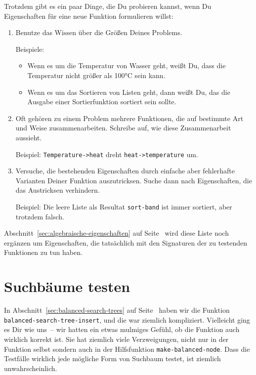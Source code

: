Trotzdem gibt es ein paar Dinge, die Du probieren kannst, wenn Du
Eigenschaften für eine neue Funktion formulieren willst:
%
\begin{enumerate}
\item Benutze das Wissen über die Größen Deines Problems.

  Beispiele:

  \begin{itemize}
    \item Wenn es um die Temperatur von Wasser geht, weißt Du,
    dass die Temperatur nicht größer als 100\si{\degree}C sein kann.
  \item Wenn es um das Sortieren von Listen geht, dann weißt Du, das
    die Ausgabe einer Sortierfunktion sortiert sein sollte.
  \end{itemize}
\item Oft gehören zu einem Problem mehrere Funktionen, die auf
  bestimmte Art und Weise zusammenarbeiten.  Schreibe auf, wie diese
  Zusammenarbeit aussieht.

  Beispiel: \lstinline{Temperature->heat} dreht
  \lstinline{heat->temperature} um.
\item Versuche, die bestehenden Eigenschaften durch einfache aber
  fehlerhafte Varianten Deiner Funktion auszutricksen.
  Suche dann nach
  Eigenschaften, die das Austricksen verhindern.

  Beispiel: Die leere Liste als Resultat \lstinline{sort-band} ist
  immer sortiert, aber trotzdem falsch.
\end{enumerate}
%
Abschnitt~\ref{sec:algebraische-eigenschaften} auf
Seite~\pageref{sec:algebraische-eigenschaften} wird diese Liste noch
ergänzen um Eigenschaften, die tatsächlich mit den Signaturen der zu
testenden Funktionen zu tun haben.

\section{Suchbäume testen}

In Abschnitt~\ref{sec:balanced-search-trees} auf
Seite~\pageref{sec:balanced-search-trees} haben wir die Funktion
\lstinline{balanced-search-tree-insert}, und die war ziemlich
kompliziert.  Vielleicht ging es Dir wie uns~-- wir hatten ein etwas
mulmiges Gefühl, ob die Funktion auch wirklich korrekt ist.
Sie hat ziemlich viele Verzweigungen, nicht nur in der Funktion selbst
sondern auch in der Hilfsfunktion \lstinline{make-balanced-node}.
Dass die Testfälle wirklich jede mögliche Form von Suchbaum testet,
ist ziemlich unwahrscheinlich.

